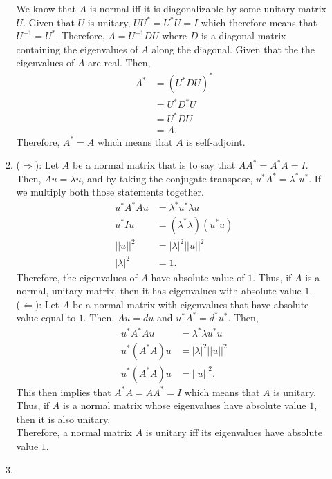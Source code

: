 \documentclass{article}
\begin{document}
\begin{enumerate}
\begin{enumerate}
        We know that $A$ is normal iff it is diagonalizable by some unitary matrix $U$. Given that $U$ is unitary, $UU^*=U^*U=I$ which therefore means that $U^{-1}=U^*$. Therefore, $A=U^{-1}DU$ where $D$ is a diagonal matrix containing the eigenvalues of $A$ along the diagonal. Given that the the eigenvalues of $A$ are real. Then,
        \begin{align*}
            A^* &= (U^*DU)^*\\
            &=U^*D^*U\\
            &=U^*DU\\
            &=A.
        \end{align*} Therefore, $A^*=A$ which means that $A$ is self-adjoint.
        
        \item
        
        ($\Rightarrow$): Let $A$ be a normal matrix that is to say that $AA^*=A^*A=I$. Then, $Au=\lambda u$, and by taking the conjugate transpose, $u^*A^*=\lambda^*u^*$. If we multiply both those statements together. 
        \begin{align*}
            u^*A^*Au&=\lambda^*u^*\lambda u\\
            u^*Iu&=(\lambda^*\lambda)(u^*u)\\
            ||u||^2&=|\lambda|^2||u||^2\\
            |\lambda|^2&=1.
        \end{align*} Therefore, the eigenvalues of $A$ have absolute value of $1$. Thus, if $A$ is a normal, unitary matrix, then it has eigenvalues with absolute value $1$.\\
        ($\Leftarrow$): Let $A$ be a normal matrix with eigenvalues that have absolute value equal to $1$. Then, $Au=du$ and $u^*A^*=d^*u^*$. Then,
        \begin{align*}
            u^*A^*Au&=\lambda^* \lambda u^*u\\
            u^*(A^*A)u&=|\lambda|^2 ||u||^2\\
            u^*(A^*A)u&=||u||^2.
        \end{align*} This then implies that $A^*A=AA^*=I$ which means that $A$ is unitary. Thus, if $A$ is a normal matrix whose eigenvalues have absolute value $1$, then it is also unitary.\\
        Therefore, a normal matrix $A$ is unitary iff its eigenvalues have absolute value $1$.
        
        \item
        

\end{enumerate}
\end{enumerate}
\end{document}
